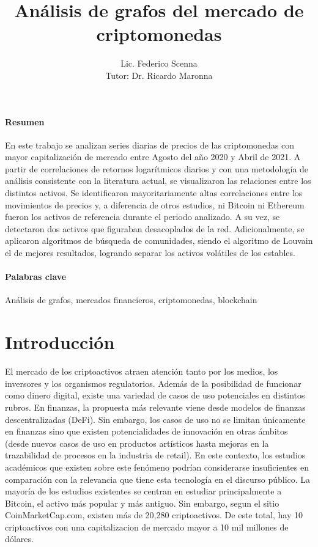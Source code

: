 \documentclass[runningheads,legalpaper,10pt]{etc/llncs}
\title{Análisis de grafos del mercado de criptomonedas}
\author{Lic. Federico Scenna\\ [1cm] {\small Tutor: Dr. Ricardo Maronna}}
\institute{ Maestría en Exploración de Datos y Descubrimiento del Conocimiento \\
Facultad de Ciencias Exactas y Naturales\\ Universidad de Buenos Aires\\
\mailsa
}
\let\stdsection\section
\renewcommand\section{\newpage\stdsection}
\begin{document}
\let\oldaddcontentsline\addcontentsline
\def\addcontentsline#1#2#3{}
\maketitle
\def\addcontentsline#1#2#3{\oldaddcontentsline{#1}{#2}{#3}}

\newpage

\paragraph{Resumen} En este trabajo se analizan series diarias de precios de las criptomonedas con mayor capitalización de mercado entre Agosto del año 2020 y Abril de 2021. A partir de correlaciones
de retornos logarítmicos diarios y con una metodología de análisis consistente con la literatura actual, se visualizaron las relaciones entre los distintos activos. Se
identificaron mayoritariamente altas correlaciones entre los movimientos de precios y, a diferencia de otros estudios, ni Bitcoin ni Ethereum fueron los activos de referencia durante el periodo analizado. A su vez, se detectaron dos activos que figuraban desacoplados de la red. 
Adicionalmente, se aplicaron algoritmos de búsqueda de comunidades, siendo el algoritmo de Louvain el de mejores resultados, logrando separar los activos volátiles de los estables.

\paragraph{Palabras clave} Análisis de grafos, mercados financieros, criptomonedas, blockchain

\tableofcontents

\newpage
\section{Introducción}

El mercado de los criptoactivos atraen atención tanto por los medios, los inversores y los organismos regulatorios. Además de la posibilidad de funcionar como dinero digital, existe una variedad de casos de uso potenciales en distintos rubros. En  finanzas, la propuesta más relevante viene desde modelos de finanzas descentralizadas (DeFi). Sin embargo, los casos de uso no se limitan únicamente en finanzas sino que existen potencialidades de innovación en otras ámbitos (desde nuevos casos de uso en productos artísticos hasta mejoras en la trazabilidad de procesos en la industria de retail). En este contexto, los estudios académicos que existen sobre este fenómeno podrían considerarse insuficientes en comparación con la relevancia que tiene esta tecnología en el discurso público. La mayoría de los estudios existentes se centran en estudiar principalmente a Bitcoin, el activo más popular y más antiguo. Sin embargo, segun el sitio CoinMarketCap.com, existen más de 20,280 criptoactivos. De este total, hay 10 criptoactivos con una capitalizacion de mercado mayor a 10 mil millones de dólares.
\end{document}
